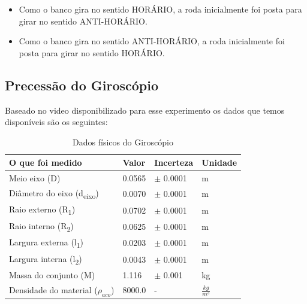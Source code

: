 \begin{itemize}
    \item Como o banco gira no sentido HORÁRIO, a roda inicialmente foi posta para girar no sentido ANTI-HORÁRIO.
    \item Como o banco gira no sentido ANTI-HORÁRIO, a roda inicialmente foi posta para girar no sentido HORÁRIO.
\end{itemize}




\subsection{Precessão do Giroscópio}

Baseado no video disponibilizado para esse experimento os dados que temos disponíveis são os seguintes:

\begin{table}[H]
    \centering
    \begin{tabular}{ |p{5cm}||p{2cm}||p{2cm}||p{2cm}|  }
        \hline
        \textbf{O que foi medido} & \textbf{Valor} & \textbf{Incerteza} & \textbf{Unidade}\\
        \hline
        Meio eixo (D)                               & 0.0565    & $\pm$ 0.0001  & m\\
        Diâmetro do eixo (d\textsubscript{eixo})    & 0.0070    & $\pm$ 0.0001  & m\\
        Raio externo (R\textsubscript{1})           & 0.0702    & $\pm$ 0.0001  & m\\
        Raio interno (R\textsubscript{2})           & 0.0625    & $\pm$ 0.0001  & m\\
        Largura externa (l\textsubscript{1})        & 0.0203    & $\pm$ 0.0001  & m\\
        Largura interna (l\textsubscript{2})        & 0.0043    & $\pm$ 0.0001  & m\\
        Massa do conjunto (M)                       & 1.116     & $\pm$ 0.001   & kg\\
        Densidade do material ($\rho _{aco}$)       & 8000.0    & -             & $\frac{kg}{m^3}$\\
        \hline
    \end{tabular}
    \caption{Dados físicos do Giroscópio}
\end{table}


